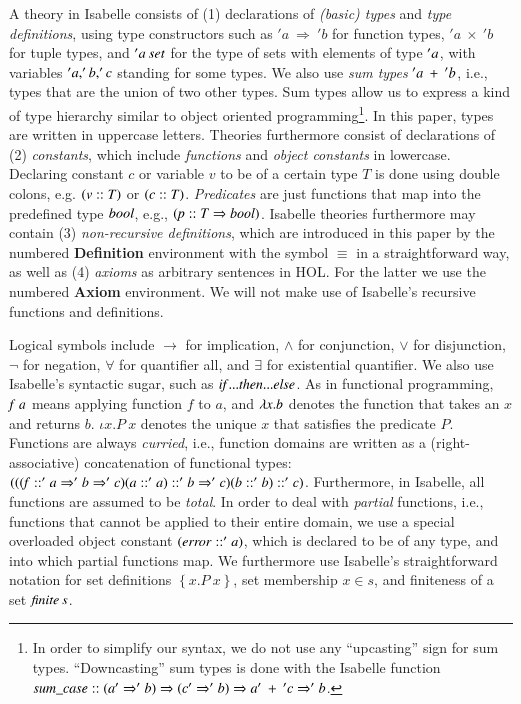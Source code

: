 \documentclass[final,authoryear,1p,times]{elsarticle}
\begin{document}
A theory in Isabelle consists of (1) declarations of \textit{(basic) types} and \textit{type definitions}, using type constructors such as $'a \:\Rightarrow\: 'b $ for function types, $'a \:\times\: 'b$ for tuple types, and ${\it 'a\: set}$ for the type of sets with elements of type ${\it 'a}$, with variables ${\it 'a, 'b, 'c}$ standing for some types. We also use \textit{sum types} ${\it 'a\: + \: 'b}$, i.e., types that are the union of two other types. Sum types allow us to express a kind of type hierarchy similar to object oriented programming\footnote{In order to simplify our syntax, we do not use any ``upcasting'' sign for sum types. ``Downcasting'' sum types is done with the Isabelle function ${\it sum\_case:: (a' \Rightarrow 'b) \Rightarrow (c' \Rightarrow 'b) \Rightarrow a'\: + \:'c \Rightarrow 'b}$.}. In this paper, types are written in uppercase letters. 
Theories furthermore consist of declarations of (2) \textit{constants}, which include \textit{functions} and \textit{object constants} in lowercase. Declaring constant $c$ or variable $v$ to be of a certain type $T$ is done using double colons, e.g. ${\it (v :: T)}$ or ${\it (c :: T)}$. \textit{Predicates} are just functions that map into the predefined type $\it{bool}$, e.g., ${\it (p :: T \Rightarrow bool)}$. Isabelle theories furthermore may contain (3) \textit{non-recursive definitions}, which are introduced in this paper by the numbered \textbf{Definition} environment with the symbol $\equiv$ in a straightforward way, as well as (4) \textit{axioms} as arbitrary sentences in HOL. For the latter we use the numbered \textbf{Axiom} environment. We will not make use of Isabelle's recursive functions and definitions. 

Logical symbols include $\rightarrow$ for implication, $\wedge$  for conjunction, $\vee$ for disjunction, $\neg$ for negation, $\forall$ for quantifier all, and $\exists$ for existential quantifier. We also use Isabelle's syntactic sugar, such as  ${\it if ... then ... else}$. As in functional programming, ${\it f \;a}$ means applying function $f$ to $a$, and ${\it \lambda x. b}$ denotes the function that takes an $x$ and returns $b$. $\iota x.P\: x$ denotes the unique $x$ that satisfies the predicate $P$. Functions are always \textit{curried}, i.e., function domains are written as a (right-associative) concatenation of functional types:\\ ${\it (((f :: 'a \Rightarrow 'b \Rightarrow 'c)(a::'a) :: 'b \Rightarrow 'c)(b::'b) ::'c)}$. Furthermore, in Isabelle, all functions are assumed to be \textit{total}. In order to deal with \textit{partial} functions, i.e., functions that cannot be applied to their entire domain, we use a special overloaded object constant ${\it (error :: 'a)}$, which is declared to be of any type, and into which partial functions map. We furthermore use Isabelle's straightforward notation for set definitions $\left\{x.P \:x\right\}$, set membership  $x \in s$, and finiteness of a set $\it{ finite \:s}$.
\end{document}
